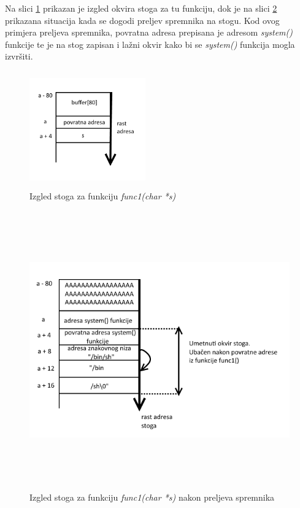 \documentclass[times, utf8, diplomski, numeric]{fer}
\begin{document}
Na slici \ref{fig:ret2lib_stackFrame} prikazan je izgled okvira
stoga za tu funkciju, dok je na slici \ref{fig:ret2lib} prikazana
situacija kada se dogodi preljev spremnika na stogu. Kod ovog
primjera preljeva spremnika, povratna adresa prepisana je adresom
\emph{system()} funkcije te je na stog zapisan i lažni okvir kako
bi se \emph{system()} funkcija mogla izvršiti.  


\begin{figure}[!htb]
\centering
\setlength\fboxsep{0pt}
\setlength\fboxrule{0.5pt}
\includegraphics[width=5cm, height=5cm]{slike/ret2lib_stackFrame}
\caption{Izgled stoga za funkciju \emph{func1(char *s)}}
\label{fig:ret2lib_stackFrame} 
\end{figure}

\begin{figure}[!htb]
\centering
\setlength\fboxsep{0pt}
\setlength\fboxrule{0.5pt}
\includegraphics[width=13cm, height=12cm]{slike/ret2lib}
\caption{Izgled stoga za funkciju \emph{func1(char *s)} nakon preljeva spremnika}
\label{fig:ret2lib} 
\end{figure}
\end{document}
